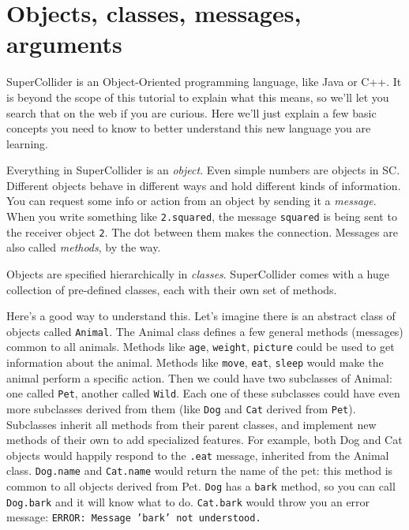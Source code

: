\section{Objects, classes, messages, arguments}

SuperCollider is an Object-Oriented programming language, like Java or C++. It is beyond the scope of this tutorial to explain what this means, so we'll let you search that on the web if you are curious. Here we'll just explain a few basic concepts you need to know to better understand this new language you are learning.

Everything in SuperCollider is an \emph{object}. Even simple numbers are objects in SC. Different objects behave in different ways and hold different kinds of information. You can request some info or action from an object by sending it a \emph{message}. When you write something like \texttt{2.squared}, the message \texttt{squared} is being sent to the receiver object \texttt{2}. The dot between them makes the connection. Messages are also called \emph{methods}, by the way.

Objects are specified hierarchically in \emph{classes}. SuperCollider comes with a huge collection of pre-defined classes, each with their own set of methods.

Here's a good way to understand this. Let's imagine there is an abstract class of objects called \texttt{Animal}. The Animal class defines a few general methods (messages) common to all animals. Methods like \texttt{age}, \texttt{weight}, \texttt{picture} could be used to get information about the animal. Methods like \texttt{move}, \texttt{eat}, \texttt{sleep} would make the animal perform a specific action. Then we could have two subclasses of Animal: one called \texttt{Pet}, another called \texttt{Wild}. Each one of these subclasses could have even more subclasses derived from them (like \texttt{Dog} and \texttt{Cat} derived from \texttt{Pet}). Subclasses inherit all methods from their parent classes, and implement new methods of their own to add specialized features. For example, both Dog and Cat objects would happily respond to the \texttt{.eat} message, inherited from the Animal class. \texttt{Dog.name} and \texttt{Cat.name} would return the name of the pet: this method is common to all objects derived from Pet.  \texttt{Dog} has a \texttt{bark} method, so you can call \texttt{Dog.bark} and it will know what to do. \texttt{Cat.bark} would throw you an error message: \texttt{ERROR: Message 'bark' not understood.}

